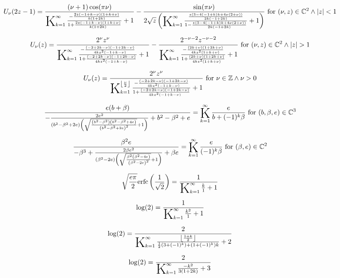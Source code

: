 \documentclass{article}
\newcommand{\bigK}{\mathop{\raisebox{-5pt}{\huge K}}}
\begin{document}
\[U_{\nu }(2 z-1)=\frac{(\nu +1) \cos (\pi  \nu )}{\bigK_{k=1}^{\infty}\frac{-\frac{2 z (-1+k-\nu ) (1+k+\nu )}{k (1+2 k)}}{1+\frac{2 z (-1+k-\nu ) (1+k+\nu )}{k (1+2 k)}}+1}-\frac{\sin (\pi  \nu )}{2 \sqrt{z} \left(\bigK_{k=1}^{\infty}\frac{\frac{z (3-4 (-1+k) k+4 \nu  (2+\nu ))}{2 k (-1+2 k)}}{1-\frac{z (3-4 (-1+k) k+4 \nu  (2+\nu ))}{2 k (-1+2 k)}}+1\right)}\text{ for }(\nu ,z)\in \mathbb{C}^2\land \left| z\right| <1\] 

\[U_{\nu }(z)=\frac{2^{\nu } z^{\nu }}{\bigK_{k=1}^{\infty}\frac{-\frac{(-2+2 k-\nu ) (-1+2 k-\nu )}{4 k z^2 (-1+k-\nu )}}{1+\frac{(-2+2 k-\nu ) (-1+2 k-\nu )}{4 k z^2 (-1+k-\nu )}}+1}-\frac{2^{-\nu -2} z^{-\nu -2}}{\bigK_{k=1}^{\infty}\frac{-\frac{(2 k+\nu ) (1+2 k+\nu )}{4 k z^2 (1+k+\nu )}}{1+\frac{(2 k+\nu ) (1+2 k+\nu )}{4 k z^2 (1+k+\nu )}}+1}\text{ for }(\nu ,z)\in \mathbb{C}^2\land \left| z\right| >1\] 

\[U_{\nu }(z)=\frac{2^{\nu } z^{\nu }}{\bigK_{k=1}^{\left\lfloor \frac{\nu }{2}\right\rfloor}\frac{-\frac{(-2+2 k-\nu ) (-1+2 k-\nu )}{4 k z^2 (-1+k-\nu )}}{1+\frac{(-2+2 k-\nu ) (-1+2 k-\nu )}{4 k z^2 (-1+k-\nu )}}+1}\text{ for }\nu \in \mathbb{Z}\land \nu >0\] 

\[\frac{e (b+\beta )}{-\frac{2 e^2}{\left(b^2-\beta ^2+2 e\right) \left(\sqrt{\frac{\left(b^2-\beta ^2\right) \left(b^2-\beta ^2+4 e\right)}{\left(b^2-\beta ^2+2 e\right)^2}}+1\right)}+b^2-\beta ^2+e}=\bigK_{k=1}^{\infty}\frac{e}{b+(-1)^k \beta }\text{ for }(b,\beta ,e)\in \mathbb{C}^3\] 

\[\frac{\beta ^2 e}{-\beta ^3+\frac{2 \beta  e^2}{\left(\beta ^2-2 e\right) \left(\sqrt{\frac{\beta ^2 \left(\beta ^2-4 e\right)}{\left(\beta ^2-2 e\right)^2}}+1\right)}+\beta  e}=\bigK_{k=1}^{\infty}\frac{e}{(-1)^k \beta }\text{ for }(\beta ,e)\in \mathbb{C}^2\] 

\[\sqrt{\frac{e \pi }{2}} \text{erfc}\left(\frac{1}{\sqrt{2}}\right)=\frac{1}{\bigK_{k=1}^{\infty}\frac{k}{1}+1}\] 

\[\log (2)=\frac{1}{\bigK_{k=1}^{\infty}\frac{k^2}{1}+1}\] 

\[\log (2)=\frac{2}{\bigK_{k=1}^{\infty}\frac{\left\lfloor \frac{1+k}{2}\right\rfloor }{\frac{1}{2} \left(3+(-1)^k\right)+\left(1+(-1)^k\right) k}+2}\] 

\[\log (2)=\frac{2}{\bigK_{k=1}^{\infty}\frac{-k^2}{3 (1+2 k)}+3}\] 
\end{document}

